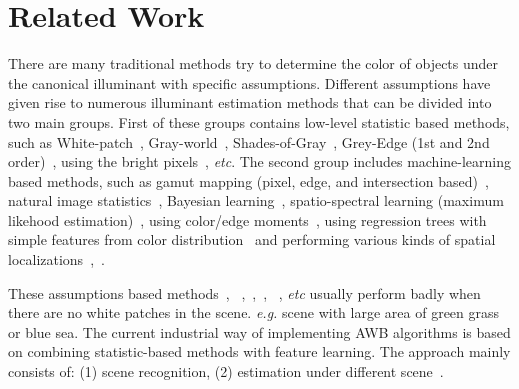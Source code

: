 \documentclass[10pt,twocolumn,letterpaper]{article}
\begin{document}
\section{Related Work}
There are many traditional methods try to determine the color of objects under the canonical illuminant
with specific assumptions.
Different assumptions have given rise to numerous illuminant estimation methods that
can be divided into two main groups.
First of these groups contains low-level statistic based methods, such as
White-patch~\cite{brainard1986analysis},
Gray-world~\cite{buchsbaum1980spatial},
Shades-of-Gray~\cite{finlayson2004shades}, Grey-Edge (1st and 2nd order)~\cite{van2007edge},
using the bright pixels~\cite{joze2012role}, \textit{etc}.
The second group includes machine-learning based methods, such as gamut mapping (pixel, edge, and intersection based)~\cite{barnard2000improvements},
natural image statistics~\cite{gijsenij2011color}, Bayesian learning~\cite{gehler2008bayesian},
spatio-spectral learning (maximum likehood estimation)~\cite{chakrabarti2012color}, using color/edge moments~\cite{finlayson2013corrected},
using regression trees with simple features from color distribution~\cite{cheng2015effective} and
performing various kinds of spatial localizations~\cite{barron2015convolutional},~\cite{DBLP:journals/corr/BarronT16}.

These assumptions based methods~\cite{brainard1986analysis},
~\cite{buchsbaum1980spatial},~\cite{finlayson2004shades},~\cite{van2007edge},
~\cite{joze2012role}, \textit{etc} usually perform badly when there are no white patches in the scene.
\textit{e.g.} scene with large area of green grass or blue sea.
The current industrial way of implementing AWB algorithms is based on combining statistic-based methods with feature learning.
The approach mainly consists of: (1) scene recognition,
(2) estimation under different scene~\cite{battiato2012instant}.
\end{document}
